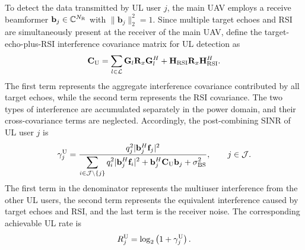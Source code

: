 \documentclass[letterpaper,journal]{IEEEtran}
\begin{document}
To detect the data transmitted by UL user $j$, the main UAV employs a receive beamformer $\mathbf b_j\in\mathbb C^{N_{\rm R}}$ with $\|\mathbf b_j\|_2^2=1$. Since multiple target echoes and RSI are simultaneously present at the receiver of the main UAV, define the target-echo-plus-RSI interference covariance matrix for UL detection as
\begin{equation}
\mathbf C_{\rm U}
=
\sum_{l\in\mathcal L}
\mathbf G_l
\mathbf R_x
\mathbf G_l^H
+
\mathbf H_{\rm RSI}
\mathbf R_x
\mathbf H_{\rm RSI}^H.
\label{eq:ul_interference_cov}
\end{equation}
The first term represents the aggregate interference covariance contributed by all target echoes, while the second term represents the RSI covariance. The two types of interference are accumulated separately in the power domain, and their cross-covariance terms are neglected. Accordingly, the post-combining SINR of UL user $j$ is
\begin{equation}
\gamma_j^{\rm U}
=
\frac{
q_j^2
|\mathbf b_j^H\mathbf f_j|^2
}{
\displaystyle
\sum_{i\in\mathcal J\setminus\{j\}}
q_i^2
|\mathbf b_j^H\mathbf f_i|^2
+
\mathbf b_j^H
\mathbf C_{\rm U}
\mathbf b_j
+
\sigma_{\rm BS}^2
},
\qquad
j\in\mathcal J.
\label{eq:ul_sinr}
\end{equation}
The first term in the denominator represents the multiuser interference from the other UL users, the second term represents the equivalent interference caused by target echoes and RSI, and the last term is the receiver noise. The corresponding achievable UL rate is
\begin{equation}
R_j^{\rm U}
=
\log_2
\left(
1+\gamma_j^{\rm U}
\right).
\label{eq:ul_rate}
\end{equation}
\end{document}
